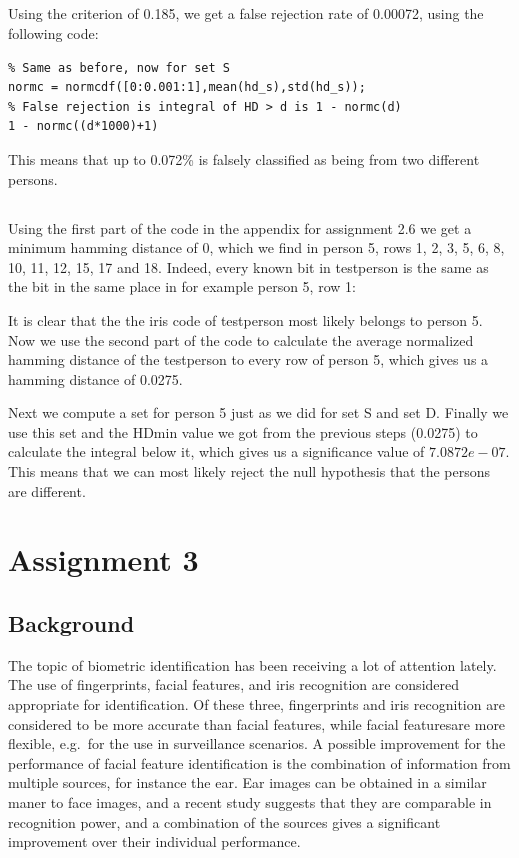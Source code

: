 \documentclass{article}
\begin{document}
\subsection{}
Using the criterion of 0.185, we get a false rejection rate of 0.00072, using the following code:
\begin{lstlisting}
% Same as before, now for set S
normc = normcdf([0:0.001:1],mean(hd_s),std(hd_s));
% False rejection is integral of HD > d is 1 - normc(d)
1 - normc((d*1000)+1)
\end{lstlisting}
This means that up to 0.072\% is falsely classified as being from two different persons.

\subsection{}
Using the first part of the code in the appendix for assignment 2.6 we get a minimum hamming distance of $0$, which we find in person 5, rows 1, 2, 3, 5, 6, 8, 10, 11, 12, 15, 17 and 18. Indeed, every known bit in testperson is the same as the bit in the same place in for example person 5, row 1:

It is clear that the the iris code of testperson most likely belongs to person 5. Now we use the second part of the code to calculate the average normalized hamming distance of the testperson to every row of person 5, which gives us a hamming distance of 0.0275.

Next we compute a set for person 5 just as we did for set S and set D. Finally we use this set and the HDmin value we got from the previous steps (0.0275) to calculate the integral below it, which gives us a significance value of $7.0872e-07$. This means that we can most likely reject the null hypothesis that the persons are different.

\section{Assignment 3}
\subsection{Background}
The topic of biometric identification has been receiving a lot of attention lately. %
The use of fingerprints, facial features, and iris recognition are considered appropriate for identification.
Of these three, fingerprints and iris recognition are considered to be more accurate than facial features,
while facial featuresare more flexible, e.g.\ for the use in surveillance scenarios.
A possible improvement for the performance of facial feature identification is the combination of information from multiple sources,
for instance the ear.
Ear images can be obtained in a similar maner to face images, 
and a recent study suggests that they are comparable in recognition power\cite{chang2003comparison},
and a combination of the sources gives a significant improvement over their individual performance.
\end{document}
